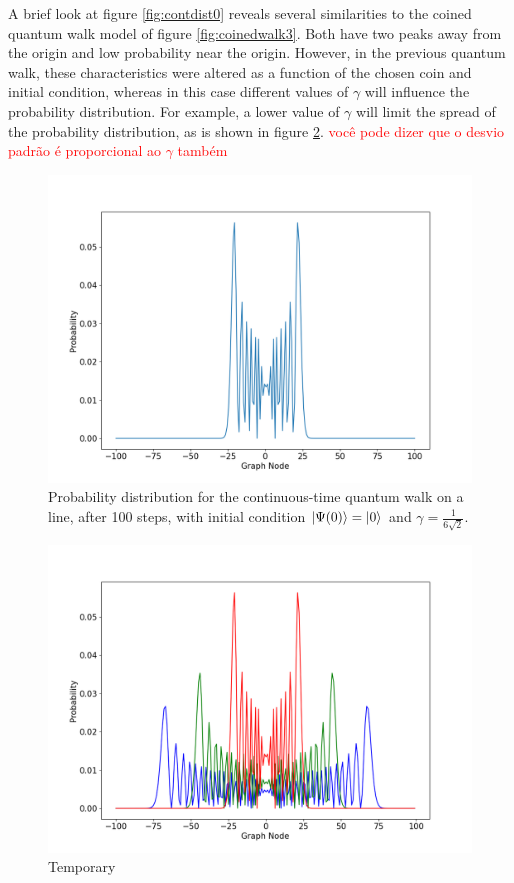 \documentclass[../../dissertation.tex]{subfiles}
\begin{document}
A brief look at figure \ref{fig:contdist0} reveals several similarities to the coined quantum walk model of figure \ref{fig:coinedwalk3}. Both have two peaks away from the origin and low probability near the origin.
However, in the previous quantum walk, these characteristics were altered as a function of the chosen coin and initial condition, whereas in this case different values of $\gamma$ will influence the probability distribution. For example, a lower value of $\gamma$ will limit the spread of the probability distribution, as is shown in figure \ref{fig:contdist1}. \textcolor{red}{você pode dizer que o desvio padrão é proporcional ao $\gamma$ também}
\begin{figure}[!h]
	\centering
	\includegraphics[scale=0.40]{img/ContQuantumWalk/ctqwSinglePsi0LowerGamma.png}
	\caption{Probability distribution for the continuous-time quantum walk on a line, after 100 steps, with initial condition $\ket{\Psi(0)}=\ket{0}$ and $\gamma=\frac{1}{6\sqrt{2}}$.} 
	\label{fig:contdist1}
\end{figure}

\begin{figure}[!h]
	\centering
	\includegraphics[scale=0.40]{img/ContQuantumWalk/ctqwMultipleGamma.png}
	\caption{Temporary} 
	\label{fig:contdist1}
\end{figure}
\end{document}
